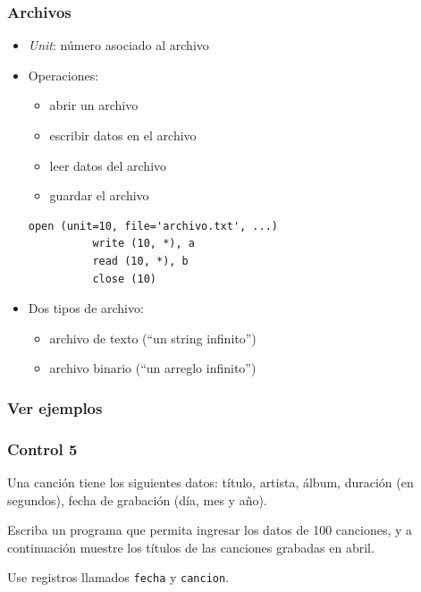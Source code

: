 \documentclass[12pt]{beamer}
\begin{document}
  \begin{frame}[fragile]
    \frametitle{Archivos}
    \begin{itemize}
      \item \emph{Unit}: número asociado al archivo
      \item Operaciones:
        \begin{itemize}
          \item abrir un archivo
          \item escribir datos en el archivo
          \item leer datos del archivo
          \item guardar el archivo
        \end{itemize}
        \pause
        \begin{lstlisting}[frame=single,gobble=6]
          open (unit=10, file='archivo.txt', ...)
          write (10, *), a
          read (10, *), b
          close (10)
        \end{lstlisting}
        \pause
      \item Dos tipos de archivo:
        \begin{itemize}
          \item archivo de texto (``un string infinito'')
          \item archivo binario (``un arreglo infinito'')
        \end{itemize}

    \end{itemize}
    
\end{frame}

  \begin{frame}
      \frametitle{Ver ejemplos}
  \end{frame}

  \begin{frame}
      \frametitle{Control 5}
      \pause

      Una canción tiene los siguientes datos: título, artista, álbum,
      duración (en segundos), fecha de grabación (día, mes y año).

      Escriba un programa que permita ingresar los datos de 100 canciones,
      y a continuación
      muestre los títulos de las canciones grabadas en abril. 

      Use registros llamados \texttt{fecha} y \texttt{cancion}.
  \end{frame}
\end{document}
